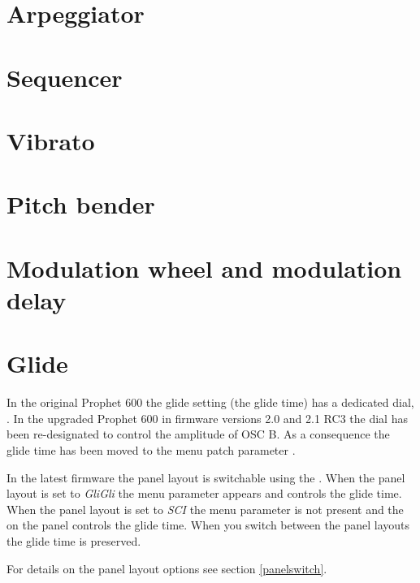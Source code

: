 \documentclass[landscape, 11pt, oneside]{report}
\newenvironment{flowtext}{\addmargin[0cm]{7cm}}{\endaddmargin} %
\begin{document}
\begin{flowtext}
\section{Arpeggiator}\label{arp}



\section{Sequencer}\label{seq}



\section{Vibrato}\label{vib}



\section{Pitch bender}\label{pitchbend}



\section{Modulation wheel and modulation delay}\label{modwheel}



\section{Glide}\label{glide}

In the original Prophet 600 the glide setting (the glide time) has a dedicated dial, \glidepot. In the upgraded Prophet 600 in firmware versions 2.0 and 2.1 RC3 the dial has been re-designated to control the amplitude of OSC B. As a consequence the glide time has been moved to the menu patch parameter \glide. 

In the latest firmware the panel layout is switchable using the \miscsett \panelswitch. When the panel layout is set to \textit{GliGli} the menu parameter \glide appears and controls the glide time. When the panel layout is set to \textit{SCI} the menu parameter \glide is not present and the \glidepot on the panel controls the glide time. When you switch between the panel layouts the glide time is preserved.

For details on the panel layout options see section \ref{panelswitch}.


\end{flowtext}
\end{document}

